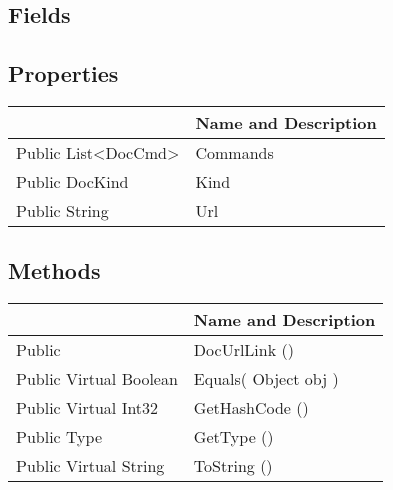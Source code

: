 \documentclass[11pt, oneside, a4paper]{book}
\begin{document}
\subsection{Fields}

\subsection{Properties}
\begin{center}
\begin{tabular}{| p{3cm} | p{12cm} | }
\hline
\textbf{ } & \textbf{ Name and Description}\\
\hline
 Public  List<DocCmd> &  Commands\hypertarget{SoftwareEngineeringTools.{}Documentation.{}DocUrlLink.{}Commands}{}\\
\hline
 Public  DocKind &  Kind\hypertarget{SoftwareEngineeringTools.{}Documentation.{}DocUrlLink.{}Kind}{}\\
\hline
 Public  String &  Url\hypertarget{SoftwareEngineeringTools.{}Documentation.{}DocUrlLink.{}Url}{}\\
\hline
\end{tabular}
\end{center}

\subsection{Methods}
\begin{center}
\begin{tabular}{| p{3cm} | p{12cm} | }
\hline
\textbf{ } & \textbf{ Name and Description}\\
\hline
 Public  &  DocUrlLink ()\hypertarget{SoftwareEngineeringTools.{}Documentation.{}DocUrlLink.{}DocUrlLink}{}\\
\hline
 Public  Virtual  Boolean &  Equals(\hypertarget{SoftwareEngineeringTools.{}Documentation.{}DocUrlLink.{}Equals\_Object}{} Object  obj  )\\
\hline
 Public  Virtual  Int32 &  GetHashCode ()\hypertarget{SoftwareEngineeringTools.{}Documentation.{}DocUrlLink.{}GetHashCode}{}\\
\hline
 Public  Type &  GetType ()\hypertarget{SoftwareEngineeringTools.{}Documentation.{}DocUrlLink.{}GetType}{}\\
\hline
 Public  Virtual  String &  ToString ()\hypertarget{SoftwareEngineeringTools.{}Documentation.{}DocUrlLink.{}ToString}{}\\
\hline
\end{tabular}
\end{center}
 
\end{document}

